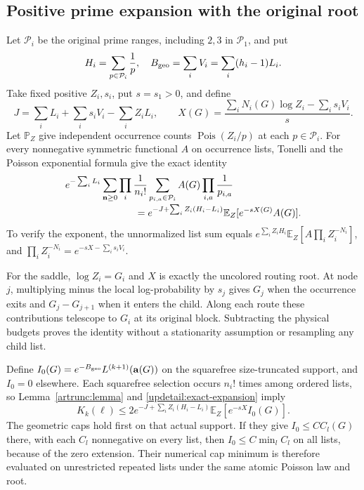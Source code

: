 \subsection{Positive prime expansion with the original root}
\label{updetail:prime-expansion}
Let $\mathcal P_i$ be the original prime ranges, including $2,3$ in
$\mathcal P_1$, and put
\[
 H_i=\sum_{p\in\mathcal P_i}\frac1p,\quad
 B_{\rm geo}=\sum_iV_i=\sum_i(h_i-1)L_i.
\]
Take fixed positive $Z_i,s_i$, put $s=s_1>0$, and define
\[
 J=\sum_iL_i+\sum_i s_iV_i-\sum_iZ_iL_i,
 \qquad
 X(G)=\frac{\sum_iN_i(G)\log Z_i-\sum_i s_iV_i}{s}.
\]
Let $\mathbb P_Z$ give independent occurrence counts
$\operatorname{Pois}(Z_i/p)$ at each $p\in\mathcal P_i$.
For every nonnegative symmetric functional $A$ on occurrence lists,
Tonelli and the Poisson exponential formula give the exact identity
\begin{align}
 &e^{-\sum_iL_i}
 \sum_{\mathbf n\geq0}\prod_i\frac1{n_i!}
 \sum_{p_{i,a}\in\mathcal P_i}
 A(G)\prod_{i,a}\frac1{p_{i,a}}
 \notag\\[-2pt]
 &\hspace{25mm}=
 e^{-J+\sum_iZ_i(H_i-L_i)}
       \mathbb E_Z[e^{-sX(G)}A(G)].
 \label{updetail:exact-expansion}
\end{align}
To verify the exponent, the unnormalized list sum equals
$e^{\sum_iZ_iH_i}\mathbb E_Z[A\prod_i Z_i^{-N_i}]$, and
$\prod_i Z_i^{-N_i}=e^{-sX-\sum_i s_iV_i}$.

For the saddle, $\log Z_i=G_i$ and $X$ is exactly the uncolored
routing root. At node $j$, multiplying minus the local log-probability
by $s_j$ gives $G_j$ when the occurrence exits and $G_j-G_{j+1}$ when
it enters the child. Along each route these contributions telescope
to $G_i$ at its original block. Subtracting the physical budgets
proves the identity without a stationarity assumption or resampling
any child list.

Define $I_0(G)=e^{-B_{\rm geo}}L^{(k+1)}(\mathbf a(G))$ on the
squarefree size-truncated support, and $I_0=0$ elsewhere. Each squarefree
selection occurs $n_i!$ times among ordered lists, so
Lemma~\ref{artrunc:lemma} and \eqref{updetail:exact-expansion} imply
\begin{equation}
 K_k(\ell)\leq
 2e^{-J+\sum_iZ_i(H_i-L_i)}
       \mathbb E_Z[e^{-sX}I_0(G)].
 \label{updetail:arithmetic-upper}
\end{equation}
The geometric caps hold first on that actual support. If they give
$I_0\leq C C_l(G)$ there, with each $C_l$ nonnegative on every list,
then $I_0\leq C\min_l C_l$ on all lists, because of the zero
extension. Their numerical cap minimum is therefore evaluated on
unrestricted repeated lists under the same atomic Poisson law and root.

